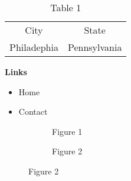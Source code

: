 
  \begin{table}
    \caption{Table 1}
    \label{table1}
    \small
    \centering
    \begin{tabular}{c c}
      City & State \\
      Philadephia & Pennsylvania \\
    \end{tabular}
  \end{table}

  \begin{section}
    \begin{subsection}
      \textbf{Links}
      \begin{subsubsection}
        \begin{itemize}
          \item Home
          \item Contact
        \end{itemize}
      \end{subsubsection}
    \end{subsection}
  \end{section}

  \begin{figure}
    \begin{subfigure}
      \texttt{[image: graph1]}
      \caption{Figure 1}
    \end{subfigure}
    \begin{subfigure}
      \texttt{[image: graph2]}
      \caption{Figure 2}
    \end{subfigure}
  \end{figure}
